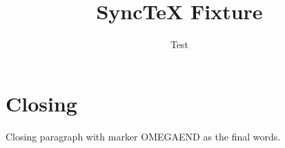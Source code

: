 \documentclass{article}
\begin{document}
\title{SyncTeX Fixture}
\author{Test}
\maketitle







\section{Closing}
Closing paragraph with marker OMEGAEND as the final words.



\end{document}
